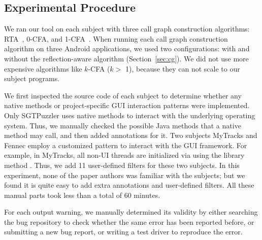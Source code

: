 \subsection{Experimental Procedure}
\label{sec:procedural}

We ran our tool on each subject with three call graph construction
algorithms: RTA~\cite{rta}, 0-CFA, and 1-CFA~\cite{kcfa}.  When running
each call graph construction algorithm on three Android applications, we
used two configurations: with and without the reflection-aware algorithm 
(Section~\ref{sec:cg}).  We did not use more expensive algorithms like $k$-CFA ($k >$ 1),
because they can not scale to our subject programs.

We first inspected the source code of each subject to determine whether any
native methods or project-specific GUI interaction patterns were implemented.
Only SGTPuzzler uses native methods to interact with
the underlying operating system. Thus, we manually checked the possible
Java methods that a native method may call, and then added \annotationnum {}
annotations for it. Two subjects MyTracks and Fennec employ a customized pattern
to interact with the GUI framework. For example, in MyTracks, all non-UI
threads are initialized via using the library method .
Thus, we add 11 user-defined filters for these two subjects.
In this experiment, none of the paper
authors was familiar with the subjects; but we found it is quite easy
to add extra annotations and user-defined filters. All these
manual parts took less than a total of 60 minutes.

For each output
warning, we manually determined its validity by either searching the
bug repository to check whether the same error has been reported before,
or submitting a new bug report, or writing a test driver to reproduce
the error.



